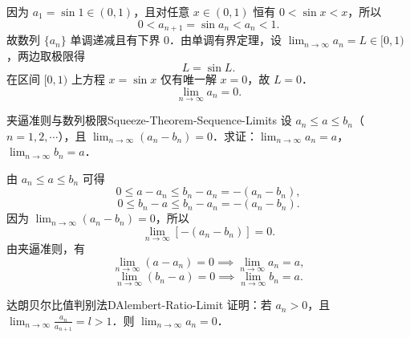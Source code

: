 \begin{solution}

    因为 $a_1 = \sin 1 \in (0, 1)$，且对任意 $x \in (0, 1)$ 恒有 $0 < \sin x < x$，所以
    \begin{equation}
        0 < a_{n+1} = \sin a_n < a_n < 1.
    \end{equation}
    故数列 $\{a_n\}$ 单调递减且有下界 $0$．由单调有界定理，设 $\lim_{n\to\infty} a_n = L \in [0, 1)$，两边取极限得
    \begin{equation}
        L = \sin L.
    \end{equation}
    在区间 $[0, 1)$ 上方程 $x = \sin x$ 仅有唯一解 $x = 0$，故 $L = 0$．
    \begin{equation}
        \boxed{\lim_{n\to\infty} a_n = 0.}
    \end{equation}
\end{solution}

\begin{problem}{夹逼准则与数列极限}{Squeeze-Theorem-Sequence-Limits}
    设 $a_n \leqslant a \leqslant b_n$（$n = 1, 2, \cdots$），且 $\lim_{n\to\infty} (a_n - b_n) = 0$．求证：$\lim_{n\to\infty} a_n = a$，$\lim_{n\to\infty} b_n = a$．
\end{problem}

\begin{myproof}
    由 $a_n \leqslant a \leqslant b_n$ 可得
    \begin{equation}
        0 \leqslant a - a_n \leqslant b_n - a_n = -(a_n - b_n),
    \end{equation}
    \begin{equation}
        0 \leqslant b_n - a \leqslant b_n - a_n = -(a_n - b_n).
    \end{equation}
    因为 $\lim_{n\to\infty} (a_n - b_n) = 0$，所以
    \begin{equation}
        \lim_{n\to\infty} [-(a_n - b_n)] = 0.
    \end{equation}
    由夹逼准则，有
    \begin{equation}
        \lim_{n\to\infty} (a - a_n) = 0 \implies \lim_{n\to\infty} a_n = a,
    \end{equation}
    \begin{equation}
        \lim_{n\to\infty} (b_n - a) = 0 \implies \lim_{n\to\infty} b_n = a.
    \end{equation}
\end{myproof}

\begin{problem}{达朗贝尔比值判别法}{DAlembert-Ratio-Limit}
    证明：若 $a_n > 0$，且 $\lim_{n\to\infty} \frac{a_n}{a_{n+1}} = l > 1$．则 $\lim_{n\to\infty} a_n = 0$．
\end{problem}

